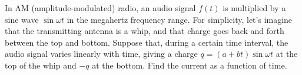 In AM (amplitude-modulated) radio, an audio signal
        $f(t)$ is multiplied by a sine wave $\sin \omega t$
        in the megahertz frequency range. For simplicity, let's
        imagine that the transmitting antenna is a whip, and that
        charge goes back and forth between the top and bottom.
        Suppose that, during a certain time interval,
        the audio signal varies linearly with time, giving
        a charge $q=(a+bt)\sin \omega t$ at the top of the whip and $-q$ at
        the bottom. Find the current as a function of time. 
        \answercheck
